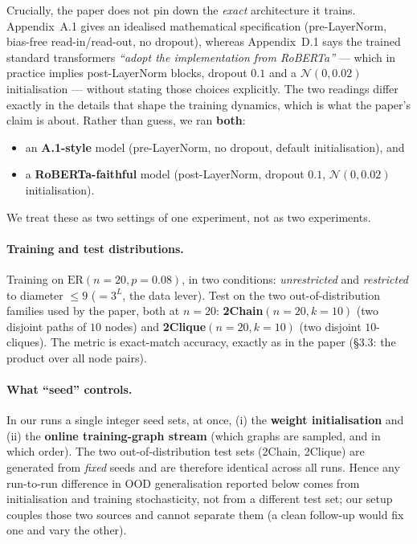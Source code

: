 \documentclass[11pt,a4paper]{article}
\begin{document}
Crucially, the paper does not pin down the \emph{exact} architecture it trains.
Appendix~A.1 gives an idealised mathematical specification (pre-LayerNorm,
bias-free read-in/read-out, no dropout), whereas Appendix~D.1 says the trained
standard transformers \emph{``adopt the implementation from RoBERTa''} --- which
in practice implies post-LayerNorm blocks, dropout $0.1$ and a
$\mathcal{N}(0, 0.02)$ initialisation --- without stating those choices
explicitly. The two readings differ exactly in the details that shape the
training dynamics, which is what the paper's claim is about. Rather than guess,
we ran \textbf{both}:
\begin{itemize}
    \item an \textbf{A.1-style} model (pre-LayerNorm, no dropout, default
          initialisation), and
    \item a \textbf{RoBERTa-faithful} model (post-LayerNorm, dropout $0.1$,
          $\mathcal{N}(0, 0.02)$ initialisation).
\end{itemize}
We treat these as two settings of one experiment, not as two experiments.

\paragraph{Training and test distributions.} Training on
\textbf{$\mathrm{ER}(n = 20, p = 0.08)$}, in two conditions: \emph{unrestricted}
and \emph{restricted} to diameter $\le 9$ ($= 3^L$, the data lever). Test on the
two out-of-distribution families used by the paper, both at $n = 20$:
\textbf{2Chain$(n = 20, k = 10)$} (two disjoint paths of $10$ nodes) and
\textbf{2Clique$(n = 20, k = 10)$} (two disjoint $10$-cliques). The metric is
exact-match accuracy, exactly as in the paper (\S3.3: the product over all node
pairs).

\paragraph{What ``seed'' controls.} In our runs a single integer seed sets, at
once, (i) the \textbf{weight initialisation} and (ii) the \textbf{online
training-graph stream} (which graphs are sampled, and in which order). The two
out-of-distribution test sets (2Chain, 2Clique) are generated from \emph{fixed}
seeds and are therefore identical across all runs. Hence any run-to-run
difference in OOD generalisation reported below comes from initialisation and
training stochasticity, not from a different test set; our setup couples those
two sources and cannot separate them (a clean follow-up would fix one and vary
the other).
\end{document}
